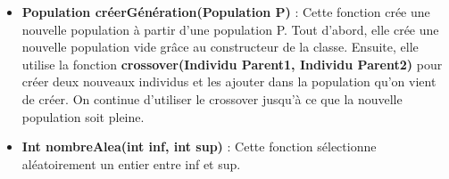 \documentclass[a4paper,11pt]{article}
\begin{document}
\begin{itemize}
							\item \textbf{Population créerGénération(Population P)} : Cette fonction crée une nouvelle population à partir d’une population P.
								Tout d’abord, elle crée une nouvelle population vide grâce au constructeur de la classe. 
								Ensuite, elle utilise la fonction \textbf{crossover(Individu Parent1, Individu Parent2)} pour créer deux nouveaux individus et les ajouter dans la population qu’on vient de créer.
								On continue d’utiliser le crossover jusqu’à ce que la nouvelle population soit pleine.\vspace{0.2cm}
							
							\item \textbf{Int nombreAlea(int inf, int sup)} : Cette fonction sélectionne aléatoirement un entier entre inf et sup.

					\end{itemize}
			
\end{document}
